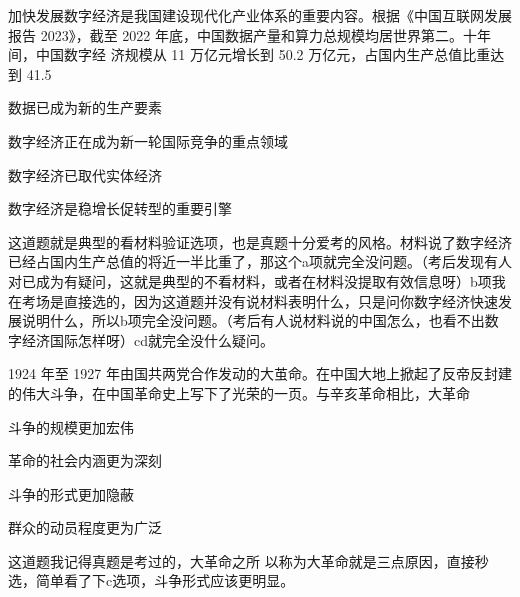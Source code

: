 \documentclass[lang=cn,blue,10pt,scheme=chinese,twocol]{zznote}
\begin{document}
\begin{exercise}加快发展数字经济是我国建设现代化产业体系的重要内容。根据《中国互联网发展报告 2023》，截至 2022 年底，中国数据产量和算力总规模均居世界第二。十年间，中国数字经 济规模从 11 万亿元增长到 50.2 万亿元，占国内生产总值比重达到 41.5%
	\begin{choice}
		\item 数据已成为新的生产要素
		\item 数字经济正在成为新一轮国际竞争的重点领域
		\item 数字经济已取代实体经济
		\item 数字经济是稳增长促转型的重要引擎
	\end{choice}
\end{exercise}
\begin{solution}
	这道题就是典型的看材料验证选项，也是真题十分爱考的风格。材料说了数字经济已经占国内生产总值的将近一半比重了，那这个a项就完全没问题。（考后发现有人对已成为有疑问，这就是典型的不看材料，或者在材料没提取有效信息呀）b项我在考场是直接选的，因为这道题并没有说材料表明什么，只是问你数字经济快速发展说明什么，所以b项完全没问题。（考后有人说材料说的中国怎么，也看不出数字经济国际怎样呀）cd就完全没什么疑问。
\end{solution}


\begin{exercise}1924 年至 1927 年由国共两党合作发动的大茧命。在中国大地上掀起了反帝反封建 的伟大斗争，在中国革命史上写下了光荣的一页。与辛亥革命相比，大革命
	\begin{choice}
		\item 斗争的规模更加宏伟
		\item 革命的社会内涵更为深刻
		\item 斗争的形式更加隐蔽
		\item 群众的动员程度更为广泛
	\end{choice}
\end{exercise}
\begin{solution}
	这道题我记得真题是考过的，大革命之所 以称为大革命就是三点原因，直接秒选，简单看了下c选项，斗争形式应该更明显。

\end{solution}
\end{document}
